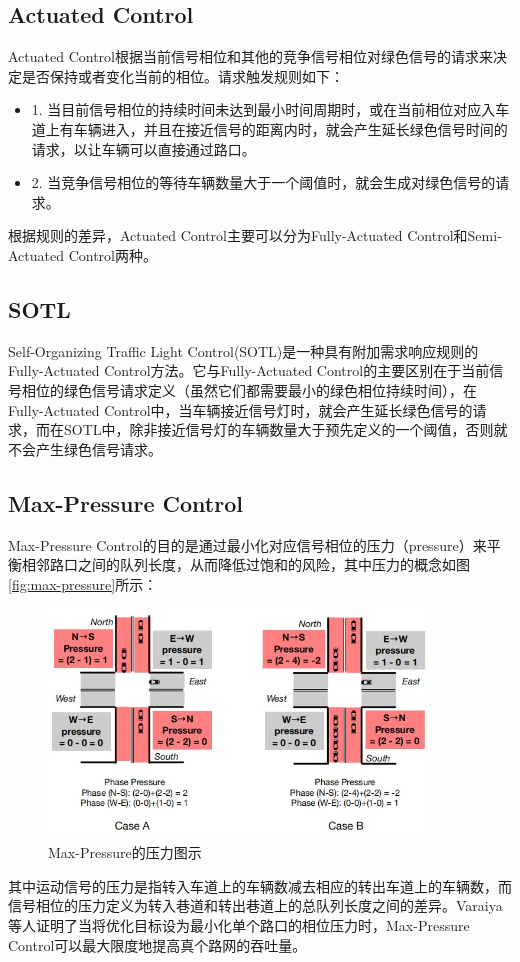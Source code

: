 \subsection{Actuated Control}
Actuated Control根据当前信号相位和其他的竞争信号相位对绿色信号的请求来决定是否保持或者变化当前的相位。请求触发规则如下：
\begin{itemize}
    \item 1. 当目前信号相位的持续时间未达到最小时间周期时，或在当前相位对应入车道上有车辆进入，并且在接近信号的距离内时，就会产生延长绿色信号时间的请求，以让车辆可以直接通过路口。 
    \item 2. 当竞争信号相位的等待车辆数量大于一个阈值时，就会生成对绿色信号的请求。
\end{itemize}
根据规则的差异，Actuated Control主要可以分为Fully-Actuated Control和Semi-Actuated Control两种。

\subsection{SOTL}
Self-Organizing Traffic Light Control(SOTL)是一种具有附加需求响应规则的Fully-Actuated Control方法。它与Fully-Actuated Control的主要区别在于当前信号相位的绿色信号请求定义（虽然它们都需要最小的绿色相位持续时间），在Fully-Actuated Control中，当车辆接近信号灯时，就会产生延长绿色信号的请求，而在SOTL中，除非接近信号灯的车辆数量大于预先定义的一个阈值，否则就不会产生绿色信号请求。

\subsection{Max-Pressure Control}
Max-Pressure Control的目的是通过最小化对应信号相位的压力（pressure）来平衡相邻路口之间的队列长度，从而降低过饱和的风险，其中压力的概念如图\autoref{fig:max-pressure}所示：
\begin{figure}[htb]
    \includegraphics[width=0.9\textwidth]{fig/max-pressure.jpg}
    \caption{Max-Pressure的压力图示}
    \label{fig:max-pressure}
\end{figure}
其中运动信号的压力是指转入车道上的车辆数减去相应的转出车道上的车辆数，而信号相位的压力定义为转入巷道和转出巷道上的总队列长度之间的差异。Varaiya\cite{varaiya2013max}等人证明了当将优化目标设为最小化单个路口的相位压力时，Max-Pressure Control可以最大限度地提高真个路网的吞吐量。

